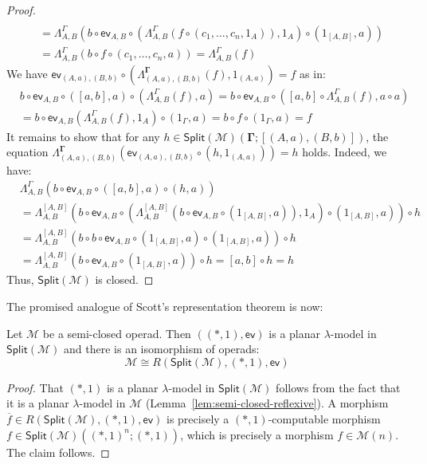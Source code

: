 \documentclass{llncs}
\begin{document}
\begin{proof}
\begin{align*}
    \\&= \Lambda^{\Gamma}_{A,B}(b \circ \mathsf{ev}_{A,B} \circ (\Lambda^\Gamma_{A,B}(f \circ (c_1,\ldots,c_n,1_A)),1_A)  \circ (1_{[A,B]},a))
    \\&= \Lambda^\Gamma_{A,B}(b \circ f \circ (c_1,\ldots,c_n,a))
    = \Lambda^\Gamma_{A,B}(f)
  \end{align*}
  We have $\mathsf{ev}_{(A,a),(B,b)} \circ (\Lambda^\mathbf{\Gamma}_{(A,a),(B,b)}(f),1_{(A,a)}) = f$ as in:
  \begin{align*}
    & b \circ \mathsf{ev}_{A,B} \circ ([a,b],a) \circ (\Lambda^\Gamma_{A,B}(f),a)
      = b \circ \mathsf{ev}_{A,B} \circ ([a,b] \circ \Lambda^\Gamma_{A,B}(f), a \circ a)
      \\&= b \circ \mathsf{ev}_{A,B} (\Lambda^\Gamma_{A,B}(f),1_A) \circ (1_\Gamma,a)
    = b \circ f \circ (1_{\Gamma},a)
    = f
  \end{align*}
  It remains to show that for any $h \in \mathsf{Split}(\mathcal{M})(\mathbf{\Gamma};[(A,a),(B,b)])$, the equation $\Lambda^{\mathbf{\Gamma}}_{(A,a),(B,b)}(\mathsf{ev}_{(A,a),(B,b)} \circ (h,1_{(A,a)})) = h$ holds. Indeed, we have:
  \begin{align*}
    & \Lambda^\Gamma_{A,B}(b \circ \mathsf{ev}_{A,B} \circ ([a,b],a) \circ (h,a))
    \\& = \Lambda^{[A,B]}_{A,B}(b \circ \mathsf{ev}_{A,B} \circ (\Lambda^{[A,B]}_{A,B}(b \circ \mathsf{ev}_{A,B} \circ (1_{[A,B]},a)),1_A) \circ (1_{[A,B]},a)) \circ h
    \\&= \Lambda^{[A,B]}_{A,B}(b \circ b \circ \mathsf{ev}_{A,B} \circ (1_{[A,B]},a) \circ (1_{[A,B]},a)) \circ h
    \\&=  \Lambda^{[A,B]}_{A,B}(b \circ \mathsf{ev}_{A,B} \circ (1_{[A,B]},a)) \circ h
    = [a,b]\circ h = h
  \end{align*}
  Thus, $\mathsf{Split}(\mathcal{M})$ is closed.
\end{proof}

The promised analogue of Scott's representation theorem is now:
\begin{theorem}\label{thm:planar-scott}
  Let $\mathcal{M}$ be a semi-closed operad. Then $((*,1),\mathsf{ev})$ is a planar $\lambda$-model in $\mathsf{Split}(\mathcal{M})$ and there is an isomorphism of operads:
  \[
    \mathcal{M} \cong R(\mathsf{Split}(\mathcal{M}),(*,1),\mathsf{ev})
  \]
\end{theorem}
\begin{proof}
  That $(*,1)$ is a planar $\lambda$-model in $\mathsf{Split}(\mathcal{M})$ follows from the fact that it is a planar $\lambda$-model in $\mathcal{M}$ (Lemma~\ref{lem:semi-closed-reflexive}). A morphism $\overline{f} \in R(\mathsf{Split}(\mathcal{M}),(*,1),\mathsf{ev})$ is precisely a $(*,1)$-computable morphism $f \in \mathsf{Split}(\mathcal{M})((*,1)^n;(*,1))$, which is precisely a morphism $f \in \mathcal{M}(n)$. The claim follows.
\end{proof}
\end{document}
